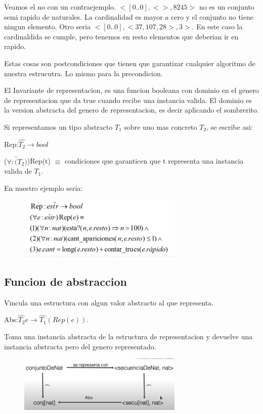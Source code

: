 \documentclass[11pt]{article}
\begin{document}
Veamos el no con un contraejemplo.
$<\left[0..0\right], <>, 8245>$
no es un conjunto semi rapido de naturales.
La cardinalidad es mayor a cero y el conjunto no tiene ningun elemento.
Otro seria
$<\left[0..0\right], <37, 107, 28>, 3>$.
En este caso la cardinaldida se cumple, pero tenemos en resto elementos que deberian ir en rapido.

Estas cosas son postcondiciones que tienen que garantizar cualquier algoritmo
de nuestra estrucutra. Lo mismo para la precondicion.

El Invariante de representacion, es una funcion booleana con dominio en el genero de
representacion que da true cuando recibe una instancia valida.
El dominio es la version abstracta del genero de representacion, es decir
aplicando el sombrerito.

Si representamos un tipo abstracto $T_1$ sobre uno mas concreto $T_2$, se escribe asi:

Rep:$\hat{T_2} \rightarrow bool$

($\forall:\hat(T_2)$)Rep(t) $\equiv$ condiciones que garanticen que t representa
una instancia valida de $T_1$.

En nuestro ejemplo seria:
\begin{figure}[h!]
    \centering
    \includegraphics[width=0.7\textwidth]{rep.png}
\end{figure}

\subsection{Funcion de abstraccion}
Vincula una estructura con algun valor abstracto al que representa.

Abs:$\hat{T_2}e \rightarrow \hat{T_1}(Rep(e))$.

Toma una instancia abstracta de la  estructura de representacion y devuelve una
instancia abstracta pero del genero representado.

\begin{figure}[h!]
    \centering
    \includegraphics[width=0.7\textwidth]{abs.png}
\end{figure}
\end{document}
